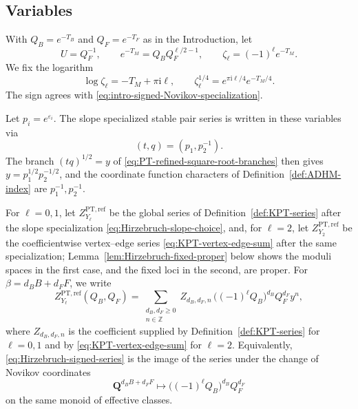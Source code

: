 \documentclass{amsart}
\theoremstyle{definition}
\numberwithin{equation}{section}
\newcommand{\Z}{\mathbb Z}
\newcommand{\eps}{\varepsilon}
\newcommand{\PT}{\mathrm{PT}}
\begin{document}
\subsection{Variables}
With \(Q_B=e^{-T_B}\) and \(Q_F=e^{-T_F}\) as in the Introduction, let
\begin{equation}
 U=Q_F^{-1},\qquad
 e^{-T_M}=Q_BQ_F^{\ell/2-1},\qquad
 \zeta_\ell=(-1)^\ell e^{-T_M}.
\label{eq:Hirzebruch-framed-variables}
\end{equation}
We fix the logarithm
\begin{equation}
 \log\zeta_\ell=-T_M+\pi\mathrm{i}\ell,
 \qquad
 \zeta_\ell^{1/4}=e^{\pi\mathrm{i}\ell/4}e^{-T_M/4}.
\label{eq:Hirzebruch-signed-branch}
\end{equation}
The sign agrees with \eqref{eq:intro-signed-Novikov-specialization}.

Let \(p_i=e^{\eps_i}\).  The slope specialized stable pair series is written in these variables via
\begin{equation}
 (t,q)=(p_1,p_2^{-1}).
\label{eq:Hirzebruch-refined-variable-change}
\end{equation}
The branch \((tq)^{1/2}=y\) of \eqref{eq:PT-refined-square-root-branches} then gives \(y=p_1^{1/2}p_2^{-1/2}\), and the coordinate function characters of Definition~\ref{def:ADHM-index} are \(p_1^{-1},p_2^{-1}\).

For \(\ell=0,1\), let \(Z_{Y_\ell}^{\PT,\mathrm{ref}}\) be the global series of Definition~\ref{def:KPT-series} after the slope specialization \eqref{eq:Hirzebruch-slope-choice}, and, for \(\ell=2\), let \(Z_{Y_2}^{\PT,\mathrm{ref}}\) be the coefficientwise vertex--edge series \eqref{eq:KPT-vertex-edge-sum} after the same specialization; Lemma~\ref{lem:Hirzebruch-fixed-proper} below shows the moduli spaces in the first case, and the fixed loci in the second, are proper.  For \(\beta=d_BB+d_FF\), we write
\begin{equation}
 Z_{Y_\ell}^{\PT,\mathrm{ref}}(Q_B,Q_F)
 =\sum_{\substack{d_B,d_F\geq0\\ n\in\Z}}Z_{d_B,d_F,n}\,
   \bigl((-1)^\ell Q_B\bigr)^{d_B}Q_F^{d_F}y^n,
\label{eq:Hirzebruch-signed-series}
\end{equation}
where \(Z_{d_B,d_F,n}\) is the coefficient supplied by Definition~\ref{def:KPT-series} for \(\ell=0,1\) and by \eqref{eq:KPT-vertex-edge-sum} for \(\ell=2\).  Equivalently, \eqref{eq:Hirzebruch-signed-series} is the image of the series under the change of Novikov coordinates
\[
 \mathbf Q^{d_BB+d_FF}\longmapsto
 \bigl((-1)^\ell Q_B\bigr)^{d_B}Q_F^{d_F}
\]
on the same monoid of effective classes.
\end{document}
